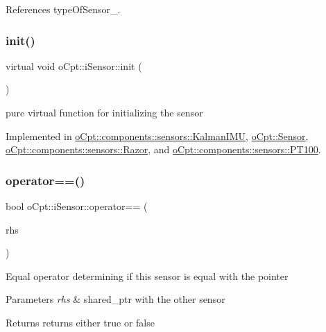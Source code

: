References type\+Of\+Sensor\+\_\+.

\hypertarget{classo_cpt_1_1i_sensor_aa8def4a41b8280f7e4e02285cd7bd734}{}\label{classo_cpt_1_1i_sensor_aa8def4a41b8280f7e4e02285cd7bd734} 
\subsubsection{\texorpdfstring{init()}{init()}}
{\footnotesize\ttfamily virtual void o\+Cpt\+::i\+Sensor\+::init (\begin{DoxyParamCaption}{ }\end{DoxyParamCaption})\hspace{0.3cm}{\ttfamily [pure virtual]}}

pure virtual function for initializing the sensor 

Implemented in \hyperlink{classo_cpt_1_1components_1_1sensors_1_1_kalman_i_m_u_a0d2dfbc9cc468e32f9c58f0a8c92c3ca}{o\+Cpt\+::components\+::sensors\+::\+Kalman\+I\+MU}, \hyperlink{classo_cpt_1_1_sensor_aa612a305a9a3091dd62cd1afb9d4dd7d}{o\+Cpt\+::\+Sensor}, \hyperlink{classo_cpt_1_1components_1_1sensors_1_1_razor_a1dd2b5a9fbac3c9510e2d3771abf358b}{o\+Cpt\+::components\+::sensors\+::\+Razor}, and \hyperlink{classo_cpt_1_1components_1_1sensors_1_1_p_t100_a296d0c3c2a55df465e127462c8c30215}{o\+Cpt\+::components\+::sensors\+::\+P\+T100}.

\hypertarget{classo_cpt_1_1i_sensor_affc8319846828aac6cab641f294a04aa}{}\label{classo_cpt_1_1i_sensor_affc8319846828aac6cab641f294a04aa} 
\subsubsection{\texorpdfstring{operator==()}{operator==()}}
{\footnotesize\ttfamily bool o\+Cpt\+::i\+Sensor\+::operator== (\begin{DoxyParamCaption}\item[{\hyperlink{classo_cpt_1_1i_sensor_a03533d2c5dc66e332d70dbb3b5e3006a}{i\+Sensor\+::ptr}}]{rhs }\end{DoxyParamCaption})\hspace{0.3cm}{\ttfamily [virtual]}}

Equal operator determining if this sensor is equal with the pointer 
\begin{DoxyParams}{Parameters}
{\em rhs} & shared\+\_\+ptr with the other sensor \\
\hline
\end{DoxyParams}
\begin{DoxyReturn}{Returns}
returns either true or false 
\end{DoxyReturn}



